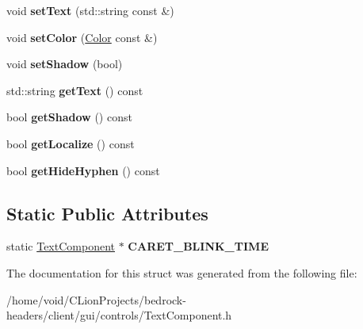 \begin{DoxyCompactItemize}
\mbox{\label{struct_text_component_ac0f921f0d914a3db42ba8408dadc9bbe}} 
void {\bfseries set\+Text} (std\+::string const \&)
\item 
\mbox{\label{struct_text_component_a496eba3a6a53e2e8e16ce7a99f666593}} 
void {\bfseries set\+Color} (\mbox{\hyperlink{struct_color}{Color}} const \&)
\item 
\mbox{\label{struct_text_component_a7aa99cf1aff398d59b2af77076a6d6fc}} 
void {\bfseries set\+Shadow} (bool)
\item 
\mbox{\label{struct_text_component_a54d6ec0ccf0f6e6f450a05b8761f5668}} 
std\+::string {\bfseries get\+Text} () const
\item 
\mbox{\label{struct_text_component_af460eb3b6186e09f328411a655431e14}} 
bool {\bfseries get\+Shadow} () const
\item 
\mbox{\label{struct_text_component_aedc3b22ee25cc179a8adf8cc027b17fa}} 
bool {\bfseries get\+Localize} () const
\item 
\mbox{\label{struct_text_component_a0d607afc8bc293ad011b05c7c9814ea7}} 
bool {\bfseries get\+Hide\+Hyphen} () const
\end{DoxyCompactItemize}
\subsection*{Static Public Attributes}
\begin{DoxyCompactItemize}
\item 
\mbox{\label{struct_text_component_a6c6972775e76b37c275fe305c38f7988}} 
static \mbox{\hyperlink{struct_text_component}{Text\+Component}} $\ast$ {\bfseries C\+A\+R\+E\+T\+\_\+\+B\+L\+I\+N\+K\+\_\+\+T\+I\+ME}
\end{DoxyCompactItemize}


The documentation for this struct was generated from the following file\+:\begin{DoxyCompactItemize}
\item 
/home/void/\+C\+Lion\+Projects/bedrock-\/headers/client/gui/controls/Text\+Component.\+h\end{DoxyCompactItemize}

